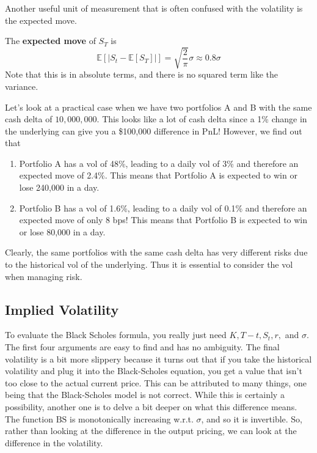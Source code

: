 \documentclass{article}
\begin{document}
    Another useful unit of measurement that is often confused with the volatility is the expected move. 

    \begin{definition}
      The \textbf{expected move} of $S_T$ is 
      \begin{equation}
        \mathbb{E}[|S_t - \mathbb{E}[S_T]|] = \sqrt{\frac{2}{\pi}} \sigma \approx 0.8 \sigma
      \end{equation}
      Note that this is in absolute terms, and there is no squared term like the variance. 
    \end{definition}

    \begin{example}
      Let's look at a practical case when we have two portfolios A and B with the same cash delta of $10,000,000$. This looks like a lot of cash delta since a 1\% change in the underlying can give you a \$100,000 difference in PnL! However, we find out that 
      \begin{enumerate}
        \item Portfolio A has a vol of 48\%, leading to a daily vol of 3\% and therefore an expected move of 2.4\%. This means that Portfolio A is expected to win or lose 240,000 in a day.  
        \item Portfolio B has a vol of 1.6\%, leading to a daily vol of 0.1\% and therefore an expected move of only 8 bps! This means that Portfolio B is expected to win or lose 80,000 in a day. 
      \end{enumerate}
      Clearly, the same portfolios with the same cash delta has very different risks due to the historical vol of the underlying. Thus it is essential to consider the vol when managing risk. 
    \end{example}

  \subsection{Implied Volatility}

    To evaluate the Black Scholes formula, you really just need $K, T - t, S_t, r,$ and $\sigma$. The first four arguments are easy to find and has no ambiguity. The final volatility is a bit more slippery because it turns out that if you take the historical volatility and plug it into the Black-Scholes equation, you get a value that isn't too close to the actual current price. This can be attributed to many things, one being that the Black-Scholes model is not correct. While this is certainly a possibility, another one is to delve a bit deeper on what this difference means. The function $\mathrm{BS}$ is monotonically increasing w.r.t. $\sigma$, and so it is invertible. So, rather than looking at the difference in the output pricing, we can look at the difference in the volatility. 
\end{document}
